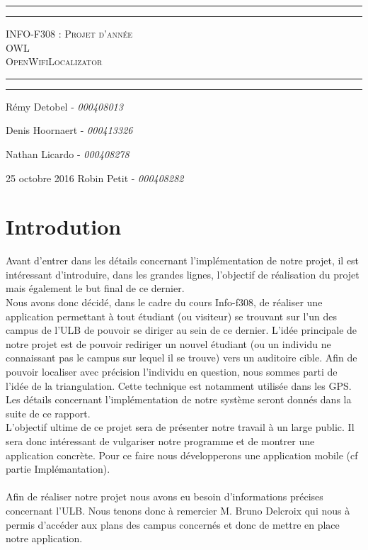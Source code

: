 \documentclass[11pt,a4paper]{article}
\title{}
\author{}
\begin{document}
\begin{center}
    \vspace*{\fill}
        \hrule
        \vspace*{2pt}
        \hrule
        \vspace*{15pt}
        \textsc{\Huge{INFO-F308 : Projet d'année \\\vspace*{8pt}
            OWL\\\vspace*{12pt}
            OpenWifiLocalizator}}
        \vspace*{15pt}
        \hrule
        \vspace*{2pt}
        \hrule
  \vspace*{\fill}
\end{center}
\null
\vfill

\large
\hfill Rémy Detobel - \emph{000408013}

\hfill Denis Hoornaert - \emph{000413326}

\hfill Nathan Licardo - \emph{000408278}

25 octobre 2016 \hfill Robin Petit - \emph{000408282}
\newpage



\section{Introdution}
Avant d'entrer dans les détails concernant l'implémentation de notre projet, il est intéressant d'introduire, dans les grandes lignes, l'objectif de réalisation du projet mais également le but final de ce dernier.\\
Nous avons donc décidé, dans le cadre du cours Info-f308, de réaliser une application permettant à tout étudiant (ou visiteur) se trouvant sur l'un des campus de l'ULB de pouvoir se diriger au sein de ce dernier. L'idée principale de notre projet est de pouvoir rediriger un nouvel étudiant (ou un individu ne connaissant pas le campus sur lequel il se trouve) vers un auditoire cible. Afin de pouvoir localiser avec précision l'individu en question, nous sommes parti de l'idée de la triangulation. Cette technique est notamment utilisée dans les GPS. Les détails concernant l'implémentation de notre système seront donnés dans la suite de ce rapport.\\
L'objectif ultime de ce projet sera de présenter notre travail à un large public. Il sera donc intéressant de \og vulgariser \fg{} notre programme et de montrer une application concrète. Pour ce faire nous développerons une application mobile (cf partie Implémantation).\\\\
Afin de réaliser notre projet nous avons eu besoin d'informations précises concernant l'ULB. Nous tenons donc à remercier M. Bruno Delcroix qui nous à permis d'accéder aux plans des campus concernés et donc de mettre en place notre application.
\end{document}
